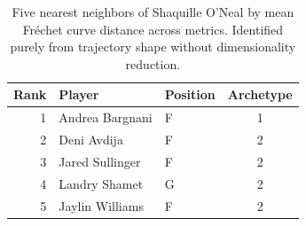 \begin{table}[htbp]
  \centering\small
  \begin{tabular}{rllc}
    \toprule
    Rank & Player & Position & Archetype \\
    \midrule
    1 & Andrea Bargnani & F & 1 \\
    2 & Deni Avdija & F & 2 \\
    3 & Jared Sullinger & F & 2 \\
    4 & Landry Shamet & G & 2 \\
    5 & Jaylin Williams & F & 2 \\
    \bottomrule
  \end{tabular}
  \caption{Five nearest neighbors of Shaquille O'Neal by mean Fr\'{e}chet curve distance across metrics. Identified purely from trajectory shape without dimensionality reduction.}
  \label{tab:Shaquille_O_Neal_frechet_curve_neighbors}
\end{table}

